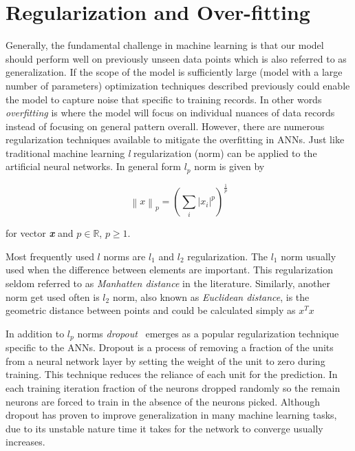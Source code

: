 \section{Regularization and Over-fitting} \label{sec:regularization}
Generally, the fundamental challenge in machine learning is that our model should perform well on previously unseen data points which is also referred to as generalization.
If the scope of the model is sufficiently large (model with a large number of parameters) optimization techniques described previously could enable the model to capture noise that specific to training records. 
In other words \emph{overfitting} is where the model will focus on individual nuances of data records instead of focusing on general pattern overall.
However, there are numerous regularization techniques available to mitigate the overfitting in ANNs.
Just like traditional machine learning \textit{l} regularization (norm) can be applied to the artificial neural networks.
In general form $l_p$ norm is given by

\begin{equation}
  \left\lVert x \right\rVert_p = \left(\sum_i \left\lvert x_i \right\rvert^p \right) ^{\frac{1}{p}}
\end{equation}

for vector \textbf{\textit{x}} and $p \in \mathbb{R}$, $p \geq 1$.

Most frequently used $l$ norms are $l_1$ and $l_2$ regularization.
The $l_1$ norm usually used when the difference between elements are important. 
This regularization seldom referred to as \emph{Manhatten distance} in the literature.
Similarly, another norm get used often is $l_2$ norm, also known as \emph{Euclidean distance}, is the geometric distance between points and could be calculated simply as $x^Tx$

In addition to $l_p$ norms \emph{dropout}~\cite{dropout} emerges as a popular regularization technique specific to the ANNs.
Dropout is a process of removing a fraction of the units from a neural network layer by setting the weight of the unit to zero during training.
This technique reduces the reliance of each unit for the prediction.
In each training iteration fraction of the neurons dropped randomly so the remain neurons are forced to train in the absence of the neurons picked.
Although dropout has proven to improve generalization in many machine learning tasks, due to its unstable nature time it takes for the network to converge usually increases.




